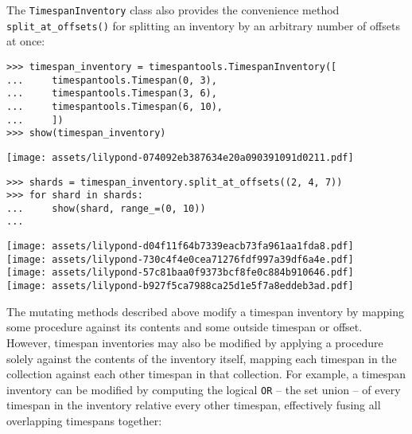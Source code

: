 \noindent The \texttt{TimespanInventory} class also provides the convenience
method \texttt{split\_at\_offsets()} for splitting an inventory by an arbitrary
number of offsets at once:

\begin{comment}
<abjad>
timespan_inventory = timespantools.TimespanInventory([
    timespantools.Timespan(0, 3),
    timespantools.Timespan(3, 6),
    timespantools.Timespan(6, 10),
    ])
show(timespan_inventory)
shards = timespan_inventory.split_at_offsets((2, 4, 7))
for shard in shards:
    show(shard, range_=(0, 10))

</abjad>
\end{comment}

\begin{abjadbookoutput}
\begin{singlespacing}
\vspace{-0.5\baselineskip}
\begin{verbatim}
>>> timespan_inventory = timespantools.TimespanInventory([
...     timespantools.Timespan(0, 3),
...     timespantools.Timespan(3, 6),
...     timespantools.Timespan(6, 10),
...     ])
>>> show(timespan_inventory)
\end{verbatim}
\noindent\texttt{[image: assets/lilypond-074092eb387634e20a090391091d0211.pdf]}
\begin{verbatim}
>>> shards = timespan_inventory.split_at_offsets((2, 4, 7))
>>> for shard in shards:
...     show(shard, range_=(0, 10))
...
\end{verbatim}
\noindent\texttt{[image: assets/lilypond-d04f11f64b7339eacb73fa961aa1fda8.pdf]}\\
\noindent\texttt{[image: assets/lilypond-730c4f4e0cea71276fdf997a39df6a4e.pdf]}\\
\noindent\texttt{[image: assets/lilypond-57c81baa0f9373bcf8fe0c884b910646.pdf]}\\
\noindent\texttt{[image: assets/lilypond-b927f5ca7988ca25d1e5f7a8eddeb3ad.pdf]}
\end{singlespacing}
\end{abjadbookoutput}

\noindent The mutating methods described above modify a timespan inventory
by mapping some procedure against its contents and some outside timespan or
offset. However, timespan inventories may also be modified by applying a
procedure solely against the contents of the inventory itself, mapping each
timespan in the collection against each other timespan in that collection.
For example, a timespan inventory can be modified by computing the logical
\texttt{OR} -- the set union -- of every timespan in the inventory relative
every other timespan, effectively fusing all overlapping timespans together:

